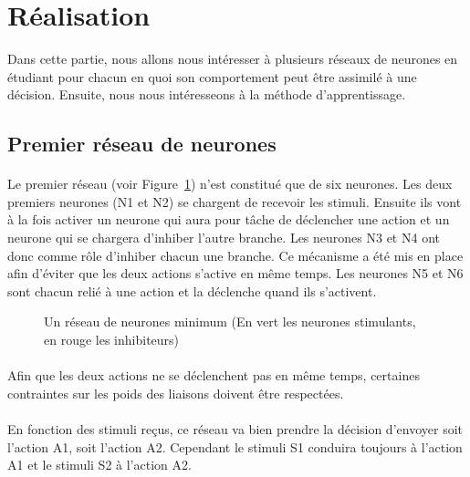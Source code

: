 \section{Réalisation}
Dans cette partie, nous allons nous intéresser à plusieurs réseaux de neurones
en étudiant pour chacun en quoi son comportement peut être assimilé à une
décision. Ensuite, nous nous intéresseons à la méthode d'apprentissage.


\subsection{Premier réseau de neurones}
\paragraph{}
Le premier réseau (voir Figure~\ref{reseau1}) n'est constitué que de six
neurones. Les deux premiers neurones (N1 et N2) se chargent de recevoir
les stimuli. Ensuite ils vont à la fois activer un neurone qui aura pour
tâche de déclencher une action et un neurone qui se chargera d'inhiber
l'autre branche. Les neurones N3 et N4 ont donc comme rôle d'inhiber chacun
une branche. Ce mécanisme a été mis en place afin d'éviter que les deux
actions s'active en même temps. Les neurones N5 et N6 sont chacun relié
à une action et la déclenche quand ils s'activent.

\begin{figure}[!h]
  \begin{center}
    
  \end{center}
  \caption{Un réseau de neurones minimum (En vert les neurones stimulants, en rouge les inhibiteurs)}
  \label{reseau1}
\end{figure}

\paragraph{}
Afin que les deux actions ne se déclenchent pas en même temps, certaines
contraintes sur les poids des liaisons doivent être respectées.

\paragraph{}
En fonction des stimuli reçus, ce réseau va bien prendre la décision
d'envoyer soit l'action A1, soit l'action A2. Cependant le
stimuli S1 conduira toujours à l'action A1 et le stimuli S2 à
l'action A2.

